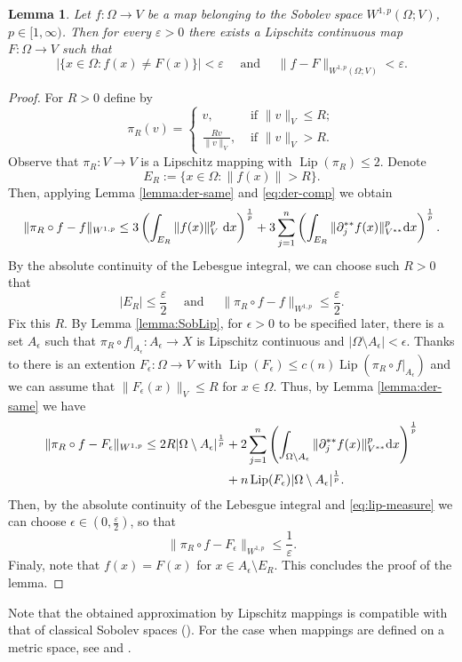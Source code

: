 \documentclass[reqno]{amsart}
\newtheorem{lem}[thm]{Lemma}
\begin{document}
\begin{lem}\label{lemma:lipapprox}
Let $f:\Omega\to V$ be a map belonging to the Sobolev space $W^{1,p}(\Omega; V)$, $p\in [1,\infty)$.
Then for every $\varepsilon>0$ there exists a Lipschitz continuous map $F:\Omega\to V$ such that
\[
|\{x\in\Omega \colon f(x) \ne F(x)\} | < \varepsilon \quad\text{ and }\quad \|f - F \|_{W^{1,p}(\Omega; V)}<\varepsilon.
\]
\end{lem}
\begin{proof}
For $R>0$ define  by
\[
\pi_R(v) = 
\begin{cases}
v, &\text{ if } \|v\|_V \leq R; \\
\frac{Rv}{\|v\|_V} , &\text{ if } \|v\|_V > R.
\end{cases}
\]
Observe that $\pi_R:V\to V$ is a Lipschitz mapping with $\operatorname{Lip}(\pi_R) \leq 2$.
Denote
\[
E_R:= \{x\in \Omega \colon \|f(x)\|> R\}.
\]
Then, applying Lemma \ref{lemma:der-same} and \eqref{eq:der-comp} we obtain 
\[
\|\pi_R\circ f  - f\|_{W^{1,p}} 
\leq 3\left(\int_{E_R} \|f(x)\|_{V}^{p}\ \textnormal{d}x\right)^{\frac{1}{p}} + 
   3\sum_{j=1}^n \left(\int_{E_R} \|\partial^{**}_j f(x) \|^p_{V^{**}} \textnormal{d}x\right)^{\frac{1}{p}}. 
\]
By the absolute continuity of the Lebesgue integral, we can choose such $R>0$ that
\[
|E_R|\leq \frac{\varepsilon}{2} \quad\text{ and }\quad  \|\pi_R\circ f  - f\|_{W^{1,p}}  \leq \frac{\varepsilon}{2}.
\]
Fix this $R$.
By Lemma \ref{lemma:SobLip}, for $\epsilon>0$ to be specified later, there is a set $A_{\epsilon}$ such that 
$\pi_R\circ f|_{A_\epsilon}:A_{\epsilon}\to X$ is Lipschitz continuous and $|\Omega\setminus A_\epsilon|< \epsilon$. 
Thanks to  \cite[Theorem 2]{JLS1986} there is an extention $F_\epsilon:\Omega\to V$ with $\operatorname{Lip}(F_\epsilon) \leq c(n)\operatorname{Lip}(\pi_R\circ f|_{A_\epsilon})$ and we can assume that $\|F_\epsilon(x)\|_V\leq R$ for $x\in\Omega$.
Thus, by Lemma \ref{lemma:der-same} we have
\begin{align}
\|\pi_R\circ f - F_\epsilon \|_{W^{1,p}} \leq 2R|\Omega\setminus A_\epsilon|^{\frac{1}{p}} &+ 2\sum_{j=1}^n \left(\int_{\Omega\setminus A_\epsilon} \|\partial^{**}_j f(x) \|^p_{V^{**}} \textnormal{d}x\right)^{\frac{1}{p}}\\
&+ n\operatorname{Lip}(F_{\epsilon})|\Omega\setminus A_\epsilon|^{\frac{1}{p}}.
\end{align}
Then, by the absolute continuity of the Lebesgue integral and \eqref{eq:lip-measure} we can choose $\epsilon\in(0,\frac{\varepsilon}{2})$, so that
\[
 \|\pi_R\circ f - F_\epsilon \|_{W^{1,p}} \leq \frac{1}{\varepsilon}.
\]
Finaly, note that $f(x) = F(x)$ for $x\in A_{\epsilon}\setminus E_R$.
This concludes the proof of the lemma.
\end{proof}
Note that the obtained approximation by Lipschitz mappings is compatible with that of classical Sobolev spaces (\cite[Theorem 4.9]{KLV2021}).
For the case when mappings are defined on a metric space, see \cite[Theorem 8.2.1]{HKST2015} and \cite[Lemma 13]{Haj2009MathAnn}.
\end{document}
